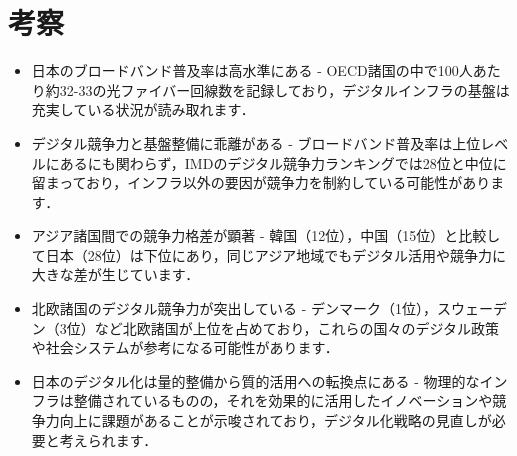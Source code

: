 \documentclass[a4paper,11pt,dvipdfmx]{ujarticle}
\begin{document}
\section{考察}
\begin{itemize}
    \item 日本のブロードバンド普及率は高水準にある - OECD諸国の中で100人あたり約32-33の光ファイバー回線数を記録しており，デジタルインフラの基盤は充実している状況が読み取れます．
    \item デジタル競争力と基盤整備に乖離がある - ブロードバンド普及率は上位レベルにあるにも関わらず，IMDのデジタル競争力ランキングでは28位と中位に留まっており，インフラ以外の要因が競争力を制約している可能性があります．
    \item アジア諸国間での競争力格差が顕著 - 韓国（12位），中国（15位）と比較して日本（28位）は下位にあり，同じアジア地域でもデジタル活用や競争力に大きな差が生じています．
    \item 北欧諸国のデジタル競争力が突出している - デンマーク（1位），スウェーデン（3位）など北欧諸国が上位を占めており，これらの国々のデジタル政策や社会システムが参考になる可能性があります．
    \item 日本のデジタル化は量的整備から質的活用への転換点にある - 物理的なインフラは整備されているものの，それを効果的に活用したイノベーションや競争力向上に課題があることが示唆されており，デジタル化戦略の見直しが必要と考えられます．
\end{itemize}



%



\end{document}
